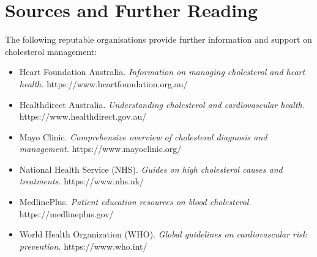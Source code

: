 \section*{Sources and Further Reading}
The following reputable organisations provide further information and support on cholesterol management:
\begin{itemize}
    \item Heart Foundation Australia. \textit{Information on managing cholesterol and heart health.} https://www.heartfoundation.org.au/
    \item Healthdirect Australia. \textit{Understanding cholesterol and cardiovascular health.} https://www.healthdirect.gov.au/
    \item Mayo Clinic. \textit{Comprehensive overview of cholesterol diagnosis and management.} https://www.mayoclinic.org/
    \item National Health Service (NHS). \textit{Guides on high cholesterol causes and treatments.} https://www.nhs.uk/
    \item MedlinePlus. \textit{Patient education resources on blood cholesterol.} https://medlineplus.gov/
    \item World Health Organization (WHO). \textit{Global guidelines on cardiovascular risk prevention.} https://www.who.int/
\end{itemize}

